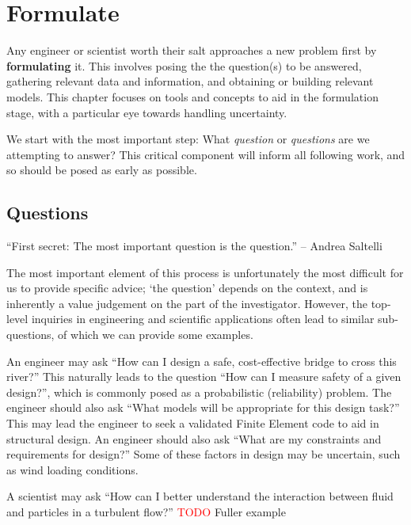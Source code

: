 \documentclass[../primer.tex]{subfiles}
\begin{document}
\chapter{Formulate} \label{ch3:formulate}
Any engineer or scientist worth their salt approaches a new problem first by
\textbf{formulating} it. This involves posing the the question(s) to be
answered, gathering relevant data and information, and obtaining or building
relevant models. This chapter focuses on tools and concepts to aid in the
formulation stage, with a particular eye towards handling uncertainty.

We start with the most important step: What \emph{question} or \emph{questions}
are we attempting to answer? This critical component will inform all following
work, and so should be posed as early as possible.

\section{Questions} \label{sec:ch3-questions}
``First secret: The most important question is the question.'' -- Andrea
Saltelli\cite{saltelli2000sensitivity}

The most important element of this process is unfortunately the most difficult
for us to provide specific advice; `the question' depends on the context, and is
inherently a value judgement on the part of the investigator. However, the
top-level inquiries in engineering and scientific applications often lead to
similar sub-questions, of which we can provide some examples.

An engineer may ask ``How can I design a safe, cost-effective bridge to cross
this river?'' This naturally leads to the question ``How can I measure safety of
a given design?'', which is commonly posed as a probabilistic (reliability)
problem. The engineer should also ask ``What models will be appropriate for this
design task?'' This may lead the engineer to seek a validated Finite Element
code to aid in structural design. An engineer should also ask ``What are my
constraints and requirements for design?'' Some of these factors in design may
be uncertain, such as wind loading conditions.

A scientist may ask ``How can I better understand the interaction between fluid
and particles in a turbulent flow?'' \textcolor{red}{TODO} Fuller example
\end{document}
